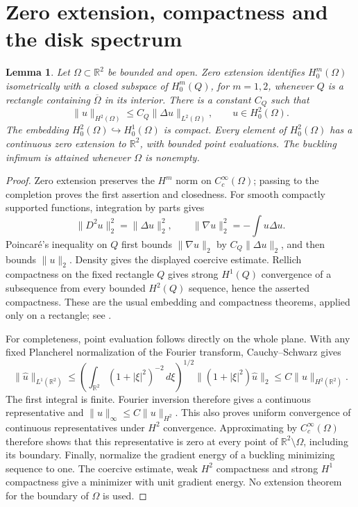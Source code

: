 \documentclass[11pt,letterpaper,reqno]{amsart}
\newtheorem{lemma}[theorem]{Lemma}
\theoremstyle{definition}
\begin{document}
\section{Zero extension, compactness and the disk spectrum}

\begin{lemma}\label{app:formfacts}
Let $\Omega\subset\mathbb R^2$ be bounded and open. Zero extension
identifies $H_0^m(\Omega)$ isometrically with a closed subspace of
$H_0^m(Q)$, for $m=1,2$, whenever $Q$ is a rectangle containing
$\overline\Omega$ in its interior. There is a constant $C_Q$ such that
\[
 \|u\|_{H^2(\Omega)}\le C_Q\|\Delta u\|_{L^2(\Omega)},
 \qquad u\in H_0^2(\Omega).
\]
The embedding $H_0^2(\Omega)\hookrightarrow H_0^1(\Omega)$ is compact.
Every element of $H_0^2(\Omega)$ has a continuous zero extension to
$\mathbb R^2$, with bounded point evaluations. The buckling infimum is attained whenever $\Omega$ is nonempty.
\end{lemma}
\begin{proof}
Zero extension preserves the $H^m$ norm on $C_c^\infty(\Omega)$;
passing to the completion proves the first assertion and closedness.
For smooth compactly supported functions, integration by parts gives
\[
 \|D^2u\|_2^2=\|\Delta u\|_2^2,\qquad
 \|\nabla u\|_2^2=-\int u\Delta u.
\]
Poincar\'e's inequality on $Q$ first bounds $\|\nabla u\|_2$ by
$C_Q\|\Delta u\|_2$, and then bounds $\|u\|_2$. Density gives the
displayed coercive estimate. Rellich compactness on the fixed
rectangle $Q$ gives strong $H^1(Q)$ convergence of a subsequence
from every bounded $H^2(Q)$ sequence, hence the asserted compactness.
These are the usual embedding and compactness theorems, applied only
on a rectangle; see \cite[Chapters~4 and~6]{AF}.

For completeness, point evaluation follows directly on the whole
plane. With any fixed Plancherel normalization of the Fourier
transform, Cauchy--Schwarz gives
\[
 \|\widehat u\|_{L^1(\mathbb R^2)}
 \le\left(\int_{\mathbb R^2}(1+|\xi|^2)^{-2}\,d\xi\right)^{1/2}
       \|(1+|\xi|^2)\widehat u\|_2
 \le C\|u\|_{H^2(\mathbb R^2)}.
\]
The first integral is finite. Fourier inversion therefore gives a
continuous representative and $\|u\|_\infty\le C\|u\|_{H^2}$.
This also proves uniform convergence of continuous representatives
under $H^2$ convergence. Approximating by $C_c^\infty(\Omega)$
therefore shows that this representative is zero at every point
of $\mathbb R^2\setminus\Omega$, including its boundary.
Finally, normalize the gradient energy of
a buckling minimizing sequence to one. The coercive estimate, weak
$H^2$ compactness and strong $H^1$ compactness give a minimizer with
unit gradient energy. No extension theorem for the boundary of
$\Omega$ is used.
\end{proof}
\end{document}
